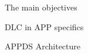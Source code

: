 \begin{frame}{The main objectives}
%
\end{frame}

\begin{frame}{DLC in APP specifics}
\end{frame}

\begin{frame}{APPDS Architecture}

\end{frame}



